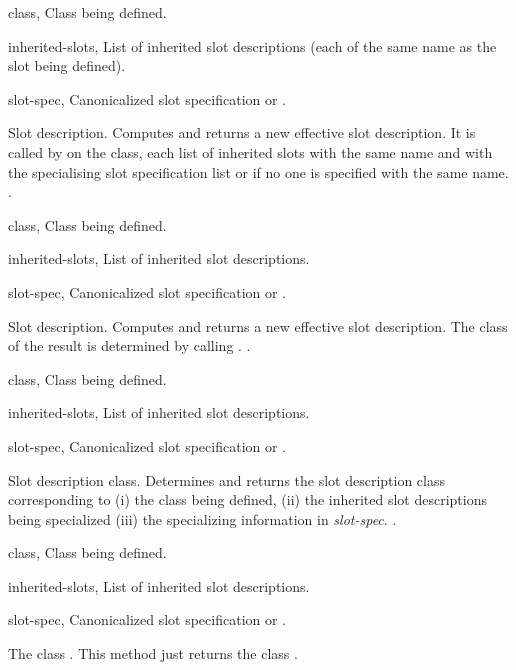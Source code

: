 \begin{optDefinition}
%
\begin{genericargs}
    \item[class, \classref{class}] Class being defined.
    \item[inherited-slots, \classref{list}] List of inherited slot descriptions
    (each of the same name as the slot being defined).
    \item[slot-spec, \classref{list}] Canonicalized slot specification or \nil.
\end{genericargs}
%
\result%
Slot description.
%
\remarks%
Computes and returns a new effective slot description. It is called by
 on the class, each list of inherited
slots with the same name and with the specialising slot specification
list or \nil\/ if no one is specified with the same name.
%
\seealso%
.

%
\begin{specargs}
    \item[class, \classref{class}] Class being defined.
    \item[inherited-slots, \classref{list}] List of inherited slot descriptions.
    \item[slot-spec, \classref{list}] Canonicalized slot specification or \nil.
\end{specargs}
%
\result%
Slot description.
%
\remarks%
Computes and returns a new effective slot description.  The class of the result
is determined by calling
.
%
\seealso%
.

%
\begin{genericargs}
    \item[class, \classref{class}] Class being defined.
    \item[inherited-slots, \classref{list}] List of inherited slot descriptions.
    \item[slot-spec, \classref{list}] Canonicalized slot specification or \nil.
\end{genericargs}
%
\result%
Slot description class.
%
\remarks%
Determines and returns the slot description class corresponding to (i)
the class being defined, (ii) the inherited slot descriptions being
specialized (iii) the specializing information in {\em slot-spec}.
%
\seealso%
.

%
\begin{specargs}
    \item[class, \classref{class}] Class being defined.
    \item[inherited-slots, \classref{list}] List of inherited slot
    descriptions.
    \item[slot-spec, \classref{list}] Canonicalized slot specification or \nil.
\end{specargs}
%
\result%
The class .
%
\remarks%
This method just returns the class .
%
\end{optDefinition}

